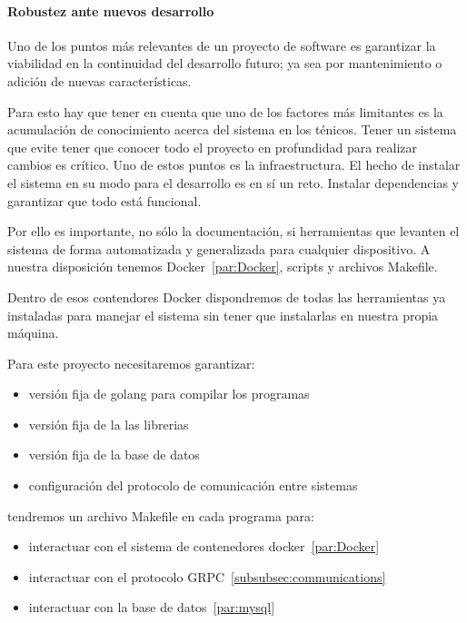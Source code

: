 \paragraph{Robustez ante nuevos desarrollo}

Uno de los puntos más relevantes de un proyecto de software es garantizar la viabilidad en la continuidad del desarrollo futuro; ya sea por mantenimiento o adición de nuevas características.

Para esto hay que tener en cuenta que uno de los factores más limitantes es la acumulación de conocimiento acerca del sistema en los ténicos. Tener un sistema que evite tener que conocer todo el proyecto en profundidad para realizar cambios es crítico. Uno de estos puntos es la infraestructura. El hecho de instalar el sistema en su modo para el desarrollo es en sí un reto. Instalar dependencias y garantizar que todo está funcional.

Por ello es importante, no sólo la documentación, si herramientas que levanten el sistema de forma automatizada y generalizada para cualquier dispositivo. A nuestra disposición tenemos Docker~\ref{par:Docker}, scripts y archivos Makefile.

Dentro de esos contendores Docker dispondremos de todas las herramientas ya instaladas para manejar el sistema sin tener que instalarlas en nuestra propia máquina.

Para este proyecto necesitaremos garantizar:

\begin{itemize}
    \item versión fija de golang para compilar los programas
    \item versión fija de la las librerias
    \item versión fija de la base de datos
    \item configuración del protocolo de comunicación entre sistemas
\end{itemize}

tendremos un archivo Makefile en cada programa para:

\begin{itemize}
    \item interactuar con el sistema de contenedores docker~\ref{par:Docker}
    \item interactuar con el protocolo GRPC~\ref{subsubsec:communications}
    \item interactuar con la base de datos~\ref{par:mysql}
\end{itemize}




